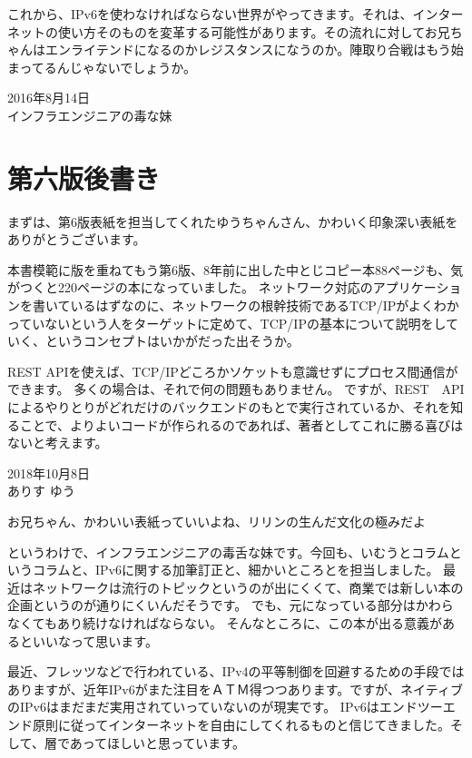 これから、IPv6を使わなければならない世界がやってきます。それは、インターネットの使い方そのものを変革する可能性があります。その流れに対してお兄ちゃんはエンライテンドになるのかレジスタンスになうのか。陣取り合戦はもう始まってるんじゃないでしょうか。

\begin{flushright}
2016年8月14日 \\
インフラエンジニアの毒な妹 \\
\end{flushright}

\section*{第六版後書き}

まずは、第6版表紙を担当してくれたゆうちゃんさん、かわいく印象深い表紙をありがとうございます。

本書模範に版を重ねてもう第6版、8年前に出した中とじコピー本88ページも、気がつくと220ページの本になっていました。
ネットワーク対応のアプリケーションを書いているはずなのに、ネットワークの根幹技術であるTCP/IPがよくわかっていないという人をターゲットに定めて、TCP/IPの基本について説明をしていく、というコンセプトはいかがだった出そうか。

REST APIを使えば、TCP/IPどころかソケットも意識せずにプロセス間通信ができます。
多くの場合は、それで何の問題もありません。
ですが、REST　APIによるやりとりがどれだけのバックエンドのもとで実行されているか、それを知ることで、よりよいコードが作られるのであれば、著者としてこれに勝る喜びはないと考えます。

\begin{flushright}
2018年10月8日 \\
ありす ゆう
\end{flushright}

お兄ちゃん、かわいい表紙っていいよね、リリンの生んだ文化の極みだよ

というわけで、インフラエンジニアの毒舌な妹です。今回も、いむうとコラムというコラムと、IPv6に関する加筆訂正と、細かいところとを担当しました。
最近はネットワークは流行のトピックというのが出にくくて、商業では新しい本の企画というのが通りにくいんだそうです。
でも、元になっている部分はかわらなくてもあり続けなければならない。
そんなところに、この本が出る意義があるといいなって思います。

最近、フレッツなどで行われている、IPv4の平等制御を回避するための手段ではありますが、近年IPv6がまた注目をＡＴＭ得つつあります。ですが、ネイティブのIPv6はまだまだ実用されていっていないのが現実です。
IPv6はエンドツーエンド原則に従ってインターネットを自由にしてくれるものと信じてきました。そして、層であってほしいと思っています。

